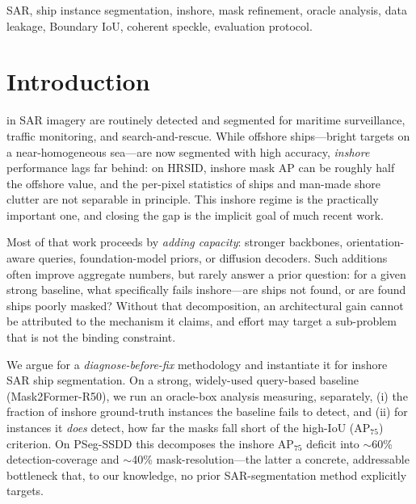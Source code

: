 \documentclass[journal]{IEEEtran}
\begin{document}
\begin{IEEEkeywords}
SAR, ship instance segmentation, inshore, mask refinement, oracle analysis, data leakage, Boundary IoU, coherent speckle, evaluation protocol.
\end{IEEEkeywords}

\section{Introduction}
 in SAR imagery are routinely detected and segmented for maritime surveillance, traffic monitoring, and search-and-rescue. While offshore ships---bright targets on a near-homogeneous sea---are now segmented with high accuracy, \emph{inshore} performance lags far behind: on HRSID, inshore mask AP can be roughly half the offshore value, and the per-pixel statistics of ships and man-made shore clutter are not separable in principle. This inshore regime is the practically important one, and closing the gap is the implicit goal of much recent work.

Most of that work proceeds by \emph{adding capacity}: stronger backbones, orientation-aware queries, foundation-model priors, or diffusion decoders. Such additions often improve aggregate numbers, but rarely answer a prior question: for a given strong baseline, what specifically fails inshore---are ships not found, or are found ships poorly masked? Without that decomposition, an architectural gain cannot be attributed to the mechanism it claims, and effort may target a sub-problem that is not the binding constraint.

We argue for a \emph{diagnose-before-fix} methodology and instantiate it for inshore SAR ship segmentation. On a strong, widely-used query-based baseline (Mask2Former-R50), we run an oracle-box analysis measuring, separately, (i) the fraction of inshore ground-truth instances the baseline fails to detect, and (ii) for instances it \emph{does} detect, how far the masks fall short of the high-IoU (AP$_{75}$) criterion. On PSeg-SSDD this decomposes the inshore AP$_{75}$ deficit into $\sim$60\% detection-coverage and $\sim$40\% mask-resolution---the latter a concrete, addressable bottleneck that, to our knowledge, no prior SAR-segmentation method explicitly targets.
\end{document}
